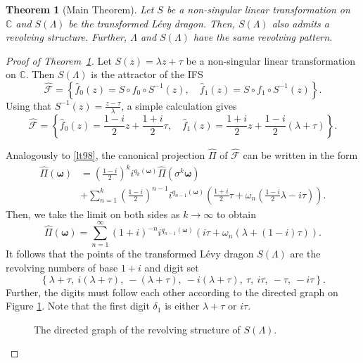 \documentclass[10pt,a4paper]{amsart}
\newtheorem{theorem}{Theorem}
\begin{document}
\begin{theorem}[Main Theorem]\label{lt93}
  Let $S$ be a non-singular linear transformation on $\mathbb{C}$ and $S(\Lambda)$ be the transformed L\'evy dragon. Then, $S(\Lambda)$ also admits a revolving structure.
  Further, $\Lambda$ and $S(\Lambda)$ have the same revolving pattern.

\end{theorem}

\begin{proof}[Proof of Theorem~\ref{lt93}]
    Let $S(z)=\lambda z+\tau$ be a non-singular linear transformation on $\mathbb{C}$. Then $S(\Lambda)$ is the attractor of the IFS 
    \begin{equation}
      \widehat{\mathcal{F}}=\left\{
        \widehat{f}_0(z)= S\circ f_0\circ S^{-1}(z), \quad
        \widehat{f}_1(z)= S\circ f_1\circ S^{-1}(z)
      \right\}.
    \end{equation}
    Using that $S^{-1}(z)=\frac{z-\tau}{\lambda}$, a simple calculation gives
    \begin{equation}
      \widehat{\mathcal{F}}=\left\{
        \widehat{f}_0(z)= \frac{1-i}{2}z+\frac{1+i}{2}\tau, \quad
        \widehat{f}_1(z)= \frac{1+i}{2}z+\frac{1-i}{2}(\lambda+\tau) 
      \right\}.
    \end{equation}

    Analogously to \eqref{lt98}, the canonical projection $\widehat{\Pi}$ of $\widehat{\mathcal{F}}$ can be written in the form
    \begin{align*}
      \widehat{\Pi}(\pmb{\omega}) &=\left(\frac{1-i}{2}\right)^k i^{q_k(\pmb{\omega})}\widehat{\Pi}(\sigma^k\pmb{\omega})\\ 
      &+ \sum_{n=1}^{k} \left(\frac{1-i}{2}\right)^{n-1} i^{q_{n-1}(\pmb{\omega})} \left(\frac{1+i}{2}\tau +\omega_n\left(\frac{1-i}{2}\lambda -i\tau\right)\right).
    \end{align*}
    Then, we take the limit on both sides as $k\to\infty$ to obtain
    \[
      \widehat{\Pi}(\pmb{\omega})=\sum_{n=1}^{\infty} \left(1+i\right)^{-n} i^{q_{n-1}(\pmb{\omega})} \left( i\tau + \omega_n\left(\lambda +(1-i)\tau\right)\right).
    \]
    It follows that the points of the transformed L\'evy dragon $S(\Lambda)$ are the revolving numbers of base $1+i$ and digit set 
    \[
      \left\{ 
        \lambda+\tau,\: i(\lambda+\tau),\: -(\lambda+\tau),\: -i(\lambda+\tau),\: 
        \tau,\: i\tau,\: -\tau,\: -i\tau
      \right\}.
    \]
    Further, the digits must follow each other according to the directed graph on Figure \ref{lt94}. Note that the first digit $\delta_1$ is either $\lambda+\tau$ or $i\tau$. 

    \begin{figure}
    
    \caption{The directed graph of the revolving structure of $S(\Lambda)$.}\label{lt94}
    \end{figure}

\end{proof}
\end{document}
